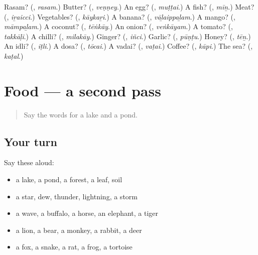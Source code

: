 \begin{tcolorbox}[breakable,colback=teal!4,colframe=teal!35!black,title={Before you move on}]
Rasam? (\textbf{}, \emph{rasam}.) Butter? (\textbf{}, \emph{veṇṇey}.) An egg? (\textbf{}, \emph{muṭṭai}.) A fish? (\textbf{}, \emph{mīṉ}.) Meat? (\textbf{}, \emph{iṟaicci}.) Vegetables? (\textbf{}, \emph{kāykaṟi}.) A banana? (\textbf{}, \emph{vāḻaippaḻam}.) A mango? (\textbf{}, \emph{māmpaḻam}.) A coconut? (\textbf{}, \emph{tēṅkāy}.) An onion? (\textbf{}, \emph{veṅkāyam}.) A tomato? (\textbf{}, \emph{takkāḷi}.) A chilli? (\textbf{}, \emph{milakāy}.) Ginger? (\textbf{}, \emph{iñci}.) Garlic? (\textbf{}, \emph{pūṇṭu}.) Honey? (\textbf{}, \emph{tēṉ}.) An idli? (\textbf{}, \emph{iṭli}.) A dosa? (\textbf{}, \emph{tōcai}.) A vadai? (\textbf{}, \emph{vaṭai}.) Coffee? (\textbf{}, \emph{kāpi}.) The sea? (\textbf{}, \emph{kaṭal}.)
\end{tcolorbox}
\section[(dialogue)]{Food — a second pass}

\label{lesson:TA-R130-second-pass-food}



\begin{quote}
Say the words for a lake and a pond.
\end{quote}

\subsection*{Your turn}
Say these aloud:

\begin{itemize}
\raggedright
  \item a lake, a pond, a forest, a leaf, soil
  \item a star, dew, thunder, lightning, a storm
  \item a wave, a buffalo, a horse, an elephant, a tiger
  \item a lion, a bear, a monkey, a rabbit, a deer
  \item a fox, a snake, a rat, a frog, a tortoise
\end{itemize}

